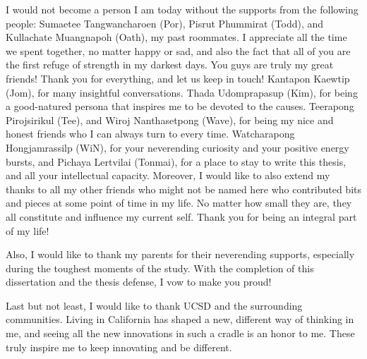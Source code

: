 \begin{spacing}{2.0}
    I would not become a person I am today without the supports from the following people:
        Sumaetee Tangwancharoen (Por),
        Pisrut Phummirat (Todd), and
        Kullachate Muangnapoh (Oath),
            my past roommates. I appreciate all the time we spent together, no matter happy or sad, and also the fact that all of you
            are the first refuge of strength in my darkest days. You guys are truly my great friends! Thank you for everything,
            and let us keep in touch!
        Kantapon Kaewtip (Jom),
            for many insightful conversations.
        Thada Udomprapasup (Kim),
            for being a good-natured persona that inspires me to be devoted to the causes.
        Teerapong Pirojsirikul (Tee), and
        Wiroj Nanthasetpong (Wave),
            for being my nice and honest friends who I can always turn to every time.
        Watcharapong Hongjamrassilp (WiN),
            for your neverending curiosity and your positive energy bursts, and
        Pichaya Lertvilai (Tonmai),
            for a place to stay to write this thesis, and all your intellectual capacity.
    Moreover, I would like to also extend my thanks to all my other friends who might not be named here who contributed bits and pieces
    at some point of time in my life. No matter how small they are, they all constitute and influence my current self. Thank you
    for being an integral part of my life!

Also, I would like to thank my parents for their neverending supports, especially during the toughest moments of the study. With the 
completion of this dissertation and the thesis defense, I vow to make you proud!

Last but not least, I would like to thank UCSD and the surrounding communities. Living in California
has shaped a new, different way of thinking in me, and seeing all the new innovations in such a cradle is an honor to me. These
truly inspire me to keep innovating and be different.
\end{spacing}
